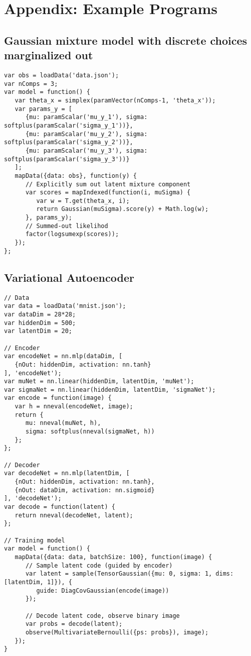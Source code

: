 \section{Appendix: Example Programs}
\label{sec:appendix_code}

\subsection{Gaussian mixture model with discrete choices marginalized out}
\label{sec:appendix_code:gmmSumOut}

\begin{lstlisting}
var obs = loadData('data.json');
var nComps = 3;
var model = function() {
   var theta_x = simplex(paramVector(nComps-1, 'theta_x'));
   var params_y = [
      {mu: paramScalar('mu_y_1'), sigma: softplus(paramScalar('sigma_y_1'))},
      {mu: paramScalar('mu_y_2'), sigma: softplus(paramScalar('sigma_y_2'))},
      {mu: paramScalar('mu_y_3'), sigma: softplus(paramScalar('sigma_y_3'))}
   ];
   mapData({data: obs}, function(y) {
      // Explicitly sum out latent mixture component
      var scores = mapIndexed(function(i, muSigma) {
         var w = T.get(theta_x, i);
         return Gaussian(muSigma).score(y) + Math.log(w);
      }, params_y);
      // Summed-out likelihod
      factor(logsumexp(scores));
   });
};
\end{lstlisting}

\subsection{Variational Autoencoder}
\label{sec:appendix_code:vae}

\begin{lstlisting}
// Data
var data = loadData('mnist.json');
var dataDim = 28*28;
var hiddenDim = 500;
var latentDim = 20;

// Encoder
var encodeNet = nn.mlp(dataDim, [
   {nOut: hiddenDim, activation: nn.tanh}
], 'encodeNet');
var muNet = nn.linear(hiddenDim, latentDim, 'muNet');
var sigmaNet = nn.linear(hiddenDim, latentDim, 'sigmaNet');
var encode = function(image) {
   var h = nneval(encodeNet, image);
   return {
      mu: nneval(muNet, h),
      sigma: softplus(nneval(sigmaNet, h))
   };
};

// Decoder
var decodeNet = nn.mlp(latentDim, [
   {nOut: hiddenDim, activation: nn.tanh},
   {nOut: dataDim, activation: nn.sigmoid}
], 'decodeNet');
var decode = function(latent) {
   return nneval(decodeNet, latent);
};

// Training model
var model = function() {
   mapData({data: data, batchSize: 100}, function(image) {
      // Sample latent code (guided by encoder)
      var latent = sample(TensorGaussian({mu: 0, sigma: 1, dims: [latentDim, 1]}), {
         guide: DiagCovGaussian(encode(image))
      });

      // Decode latent code, observe binary image
      var probs = decode(latent);
      observe(MultivariateBernoulli({ps: probs}), image);
   });
}
\end{lstlisting}

